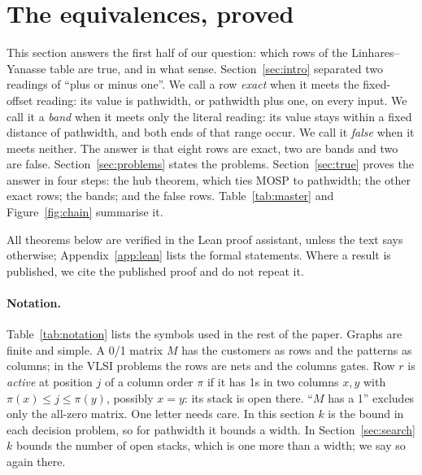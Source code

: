 \section{The equivalences, proved}
\label{sec:equiv}

This section answers the first half of our question: which rows of the
Linhares--Yanasse table are true, and in what sense. Section~\ref{sec:intro}
separated two readings of ``plus or minus one''. We call a row \emph{exact}
when it meets the fixed-offset reading: its value is pathwidth, or pathwidth
plus one, on every input. We call it a \emph{band} when it meets only the
literal reading: its value stays within a fixed distance of pathwidth, and
both ends of that range occur. We call it \emph{false} when it meets neither.
The answer is that eight rows are exact, two are bands and two are false.
Section~\ref{sec:problems} states the problems. Section~\ref{sec:true} proves
the answer in four steps: the hub theorem, which ties MOSP to pathwidth; the
other exact rows; the bands; and the false rows. Table~\ref{tab:master} and
Figure~\ref{fig:chain} summarise it.

All theorems below are verified in the Lean proof assistant, unless the text
says otherwise; Appendix~\ref{app:lean} lists the formal statements. Where a
result is published, we cite the published proof and do not repeat it.

\paragraph{Notation.} Table~\ref{tab:notation} lists the symbols used in the
rest of the paper. Graphs are finite and simple. A 0/1 matrix $M$ has the
customers as rows and the patterns as columns; in the VLSI problems the rows
are nets and the columns gates. Row $r$ is \emph{active} at position $j$ of a
column order $\pi$ if it has 1s in two columns $x,y$ with
$\pi(x)\le j\le\pi(y)$, possibly $x=y$: its stack is open there. ``$M$ has a
1'' excludes only the all-zero matrix. One letter needs care. In this section
$k$ is the bound in each decision problem, so for pathwidth it bounds a width.
In Section~\ref{sec:search} $k$ bounds the number of open stacks, which is one
more than a width; we say so again there.

